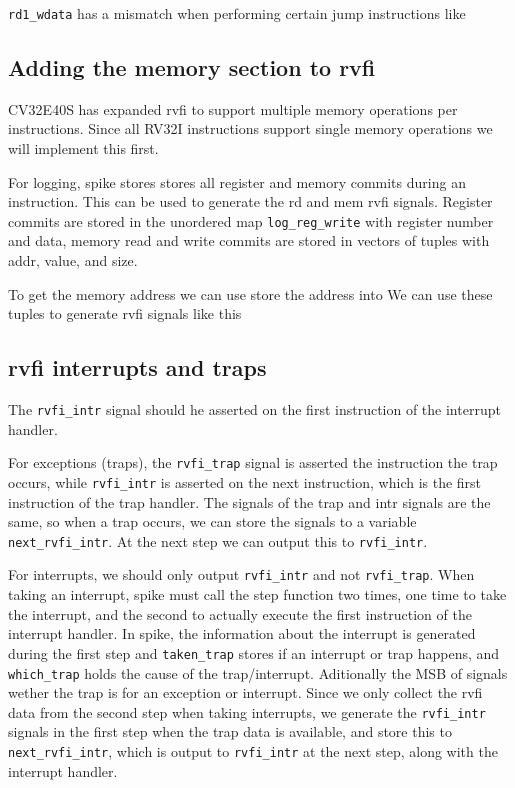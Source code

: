 \lstinline{rd1_wdata} has a mismatch when performing certain jump instructions like 


\subsection{Adding the memory section to rvfi}

CV32E40S has expanded rvfi to support multiple memory operations per instructions\cite{openhwgroupRISCVFormalInterface2023a}. Since all RV32I instructions support single memory operations we will implement this first.

For logging, spike stores stores all register and memory commits during an instruction. This can be used to generate the rd and mem rvfi signals. Register commits are stored in the unordered map \lstinline{log_reg_write} with register number and data, memory read and write commits are stored in vectors of tuples with addr, value, and size.

To get the memory address we can use store the address into \lstinline{}
We can use these tuples to generate rvfi signals like this 

\subsection{rvfi interrupts and traps}

The \lstinline{rvfi_intr} signal should he asserted on the first instruction of the interrupt handler. 

For exceptions (traps), the \lstinline{rvfi_trap} signal is asserted the instruction the trap occurs, while \lstinline{rvfi_intr} is asserted on the next instruction, which is the first instruction of the trap handler. The signals of the trap and intr signals are the same, so when a trap occurs, we can store the signals to a variable \lstinline{next_rvfi_intr}. At the next step we can output this to \lstinline{rvfi_intr}.

For interrupts, we should only output \lstinline{rvfi_intr} and not \lstinline{rvfi_trap}. When taking an interrupt, spike must call the step function two times, one time to take the interrupt, and the second to actually execute the first instruction of the interrupt handler. In spike, the information about the interrupt is generated during the first step and \lstinline{taken_trap} stores if an interrupt or trap happens, and \lstinline{which_trap} holds the cause of the trap/interrupt. Aditionally the MSB of signals wether the trap is for an exception or interrupt. Since we only collect the rvfi data from the second step when taking interrupts, we generate the \lstinline{rvfi_intr} signals in the first step when the trap data is available, and store this to \lstinline{next_rvfi_intr}, which is output to \lstinline{rvfi_intr} at the next step, along with the interrupt handler.



